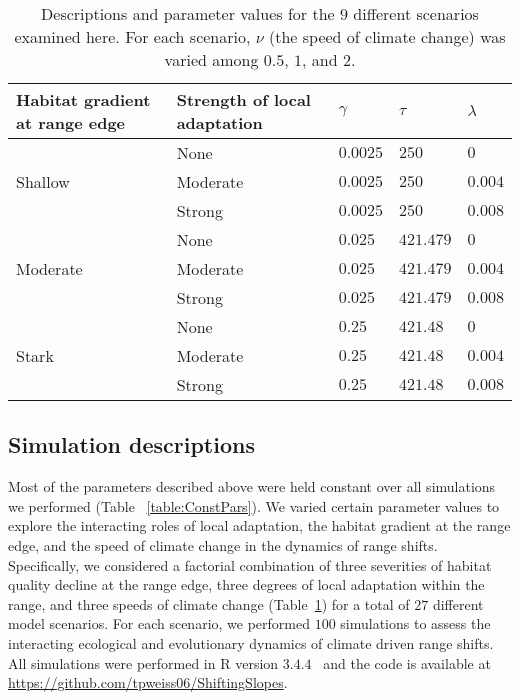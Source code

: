 \documentclass[11pt, oneside]{article}
\begin{document}
\begin{table}
\renewcommand{\arraystretch}{1.5}
  \begin{tabular}{ p{4cm} | p{4cm} | p{1.5cm} | p{1.5cm} | p{1.5cm} }
    \hline
    Habitat gradient at range edge & Strength of local adaptation & $\gamma$ & $\tau$ & $\lambda$  \\ \hline \hline
     & None & $0.0025$ & $250$ & $0$ \\
    Shallow & Moderate & $0.0025$ & $250$ & $0.004$ \\
     & Strong & $0.0025$ & $250$ & $0.008$ \\ \hline
     & None & $0.025$ & $421.479$ & $0$ \\
    Moderate & Moderate & $0.025$ & $421.479$ & $0.004$ \\
     & Strong & $0.025$ & $421.479$ & $0.008$ \\ \hline
     & None & $0.25$ & $421.48$ & $0$ \\
    Stark & Moderate & $0.25$ & $421.48$ & $0.004$ \\
     & Strong & $0.25$ & $421.48$ & $0.008$ \\ 
    \hline
  \end{tabular}
\caption[LoF entry]{Descriptions and parameter values for the $9$ different scenarios examined here. For each scenario, $\nu$ (the speed of climate change) was varied among $0.5$, $1$, and $2$.}
\label{table:Scenarios}
\end{table}

\subsection{Simulation descriptions}
Most of the parameters described above were held constant over all simulations we performed (Table ~\ref{table:ConstPars}). We varied certain parameter values to explore the interacting roles of local adaptation, the habitat gradient at the range edge, and the speed of climate change in the dynamics of range shifts. Specifically, we considered a factorial combination of three severities of habitat quality decline at the range edge, three degrees of local adaptation within the range, and three speeds of climate change (Table~\ref{table:Scenarios}) for a total of $27$ different model scenarios. For each scenario, we performed $100$ simulations to assess the interacting ecological and evolutionary dynamics of climate driven range shifts. All simulations were performed in R version $3.4.4$~\citep{team2000r} and the code is available at \url{https://github.com/tpweiss06/ShiftingSlopes}. 



\end{document}
